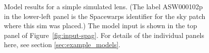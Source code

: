 \documentclass[12pt,preprint]{aastex}
\newcommand{\sw}{Spacewarps\xspace}
\begin{document}
\begin{figure}
{  }
  \caption[result 6941 (ASW000102p)]{Model results for a simple
    simulated lens.  (The label ASW000102p in the lower-left panel is
    the \sw identifier for the sky patch where this sim was placed.)
    The model input is shown in the top panel of
    Figure~\ref{fig:input-spag}.  For details of the individual panels
    here, see section \ref{sec:example_models}.}
  \label{fig:6941}
\end{figure}
  
\end{document}
